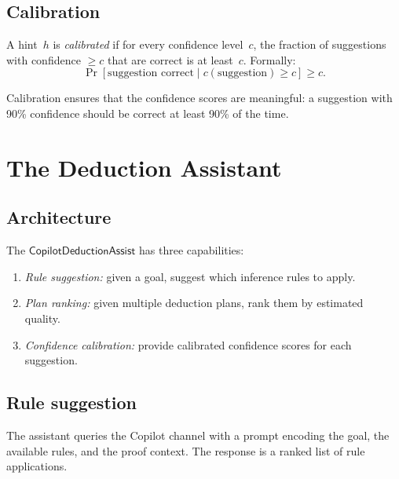 \documentclass[11pt]{article}
\newcommand{\CDA}{\mathsf{CopilotDeductionAssist}}
\begin{document}
\subsection{Calibration}

\begin{definition}\label{def:calibhint}
A hint~$h$ is \emph{calibrated} if for every confidence
level~$c$, the fraction of suggestions with confidence
$\geq c$ that are correct is at least~$c$.  Formally:
\[
  \Pr[\text{suggestion correct} \mid c(\text{suggestion}) \geq c]
  \geq c.
\]
\end{definition}

\begin{remark}
Calibration ensures that the confidence scores are
meaningful: a suggestion with 90\% confidence should be
correct at least 90\% of the time.
\end{remark}

\section{The Deduction Assistant}\label{sec:assistant}

\subsection{Architecture}

The $\CDA$ has three capabilities:
\begin{enumerate}
\item \emph{Rule suggestion:} given a goal, suggest which
      inference rules to apply.
\item \emph{Plan ranking:} given multiple deduction plans,
      rank them by estimated quality.
\item \emph{Confidence calibration:} provide calibrated
      confidence scores for each suggestion.
\end{enumerate}

\subsection{Rule suggestion}

The assistant queries the Copilot channel with a prompt
encoding the goal, the available rules, and the proof context.
The response is a ranked list of rule applications.
\end{document}
